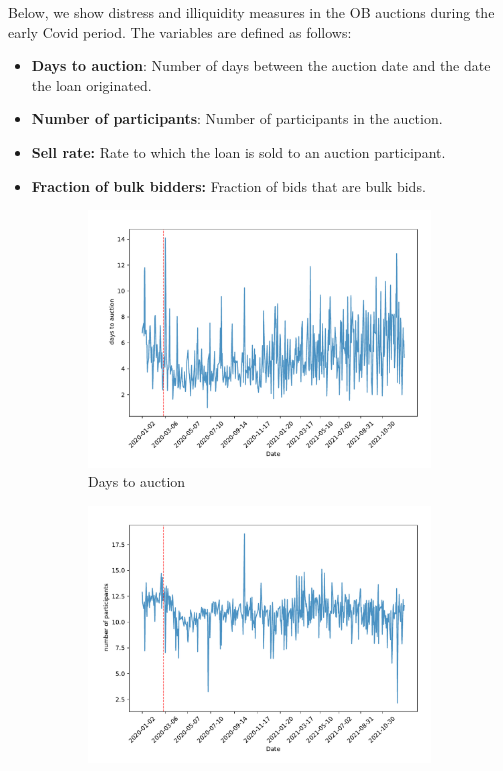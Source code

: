 \documentclass[11pt,a4paper]{article}
\begin{document}
Below, we show distress and illiquidity measures in the OB auctions during the early Covid period. The variables are defined as follows:
\begin{itemize}
\item \textbf{Days to auction}: Number of days between the auction date and the date the loan originated.
\item \textbf{Number of participants}: Number of participants in the auction.
\item  \textbf{Sell rate:} Rate to which the loan is sold to an auction participant. 
\item \textbf{Fraction of bulk bidders:} Fraction of bids that are bulk bids.
\end{itemize}
\begin{figure}[h]
  \centering
  \begin{subfigure}[b]{0.49\textwidth}
      \includegraphics[width=0.998\textwidth]{../results/figures/DaysToAuction_mean_mat30_loan1_timeseries_nr_1_7.pdf}
      \caption{Days to auction}
     \end{subfigure}
     \begin{subfigure}[b]{0.49\textwidth}
      \includegraphics[width=0.998\textwidth]{../results/figures/Number of Participants_mean_mat30_loan1_timeseries_nr_1_7.pdf}

\end{subfigure}
\end{figure}
\end{document}
